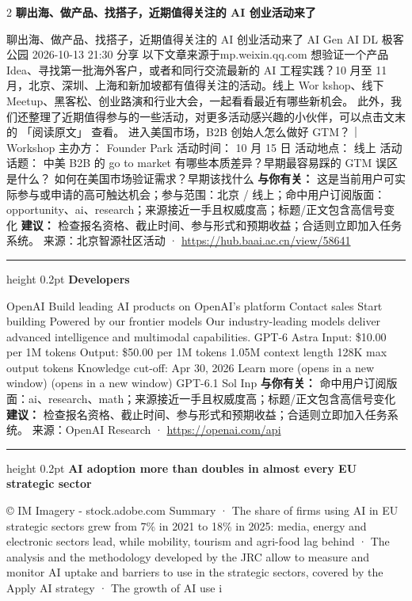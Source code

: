\documentclass[10.5pt]{ctexart}
\begin{document}
\begin{multicols}{2}
{\large\bfseries 聊出海、做产品、找搭子，近期值得关注的 AI 创业活动来了}\par
聊出海、做产品、找搭子，近期值得关注的 AI 创业活动来了 AI Gen AI DL 极客公园 2026-10-13 21:30 分享 以下文章来源于mp.weixin.qq.com 想验证一个产品 Idea、寻找第一批海外客户，或者和同行交流最新的 AI 工程实践？10 月至 11 月，北京、深圳、上海和新加坡都有值得关注的活动。线上 Wor kshop、线下 Meetup、黑客松、创业路演和行业大会，一起看看最近有哪些新机会。 此外，我们还整理了近期值得参与的一些活动，对更多活动感兴趣的小伙伴，可以点击文末的 「阅读原文」 查看。 进入美国市场，B2B 创始人怎么做好 GTM？｜Workshop 主办方： Founder Park 活动时间： 10 月 15 日 活动地点： 线上 活动话题： 中美 B2B 的 go to market 有哪些本质差异？早期最容易踩的 GTM 误区是什么？ 如何在美国市场验证需求？早期该找什么
\textbf{与你有关：} 这是当前用户可实际参与或申请的高可触达机会；参与范围：北京 / 线上；命中用户订阅版面：opportunity、ai、research；来源接近一手且权威度高；标题/正文包含高信号变化
\textbf{建议：} 检查报名资格、截止时间、参与形式和预期收益；合适则立即加入任务系统。
{\footnotesize\color{ormuted} 来源：北京智源社区活动 · \url{https://hub.baai.ac.cn/view/58641}}
\vspace{2mm}
\hrule height 0.2pt
\vspace{2mm}
{\large\bfseries Developers}\par
OpenAI Build leading AI products on OpenAI’s platform Contact sales Start building Powered by our frontier models Our industry-leading models deliver advanced intelligence and multimodal capabilities. GPT-6 Astra Input: \$10.00 per 1M tokens Output: \$50.00 per 1M tokens 1.05M context length 128K max output tokens Knowledge cut-off: Apr 30, 2026 Learn more (opens in a new window) (opens in a new window) GPT-6.1 Sol Inp
\textbf{与你有关：} 命中用户订阅版面：ai、research、math；来源接近一手且权威度高；标题/正文包含高信号变化
\textbf{建议：} 检查报名资格、截止时间、参与形式和预期收益；合适则立即加入任务系统。
{\footnotesize\color{ormuted} 来源：OpenAI Research · \url{https://openai.com/api}}
\vspace{2mm}
\hrule height 0.2pt
\vspace{2mm}
{\large\bfseries AI adoption more than doubles in almost every EU strategic sector}\par
© IM Imagery - stock.adobe.com Summary · The share of firms using AI in EU strategic sectors grew from 7\% in 2021 to 18\% in 2025: media, energy and electronic sectors lead, while mobility, tourism and agri-food lag behind · The analysis and the methodology developed by the JRC allow to measure and monitor AI uptake and barriers to use in the strategic sectors, covered by the Apply AI strategy · The growth of AI use i

\end{multicols}
\end{document}
